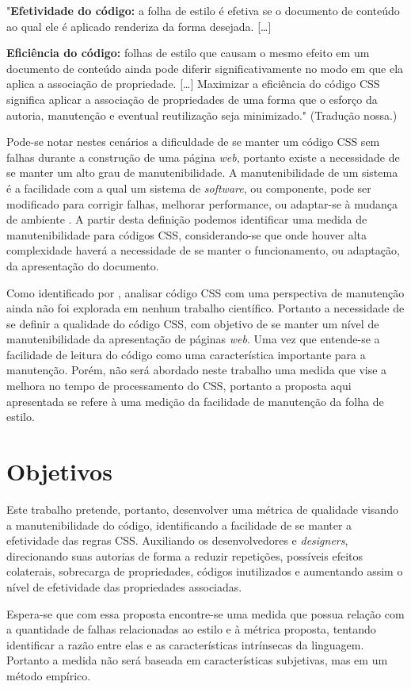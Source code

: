 \begin{citacao}
	"\textbf{Efetividade do código:} a folha de estilo é efetiva se o documento de conteúdo ao qual ele é aplicado renderiza da forma desejada. [\ldots]
	
	\textbf{Eficiência do código:} folhas de estilo que causam o mesmo efeito em um documento de conteúdo ainda pode diferir significativamente no modo em que ela aplica a associação de propriedade. [\ldots] Maximizar a eficiência do código CSS significa aplicar a associação de propriedades de uma forma que o esforço da autoria, manutenção e eventual reutilização seja minimizado." (Tradução nossa.)
\end{citacao}

Pode-se notar nestes cenários a dificuldade de se manter um código CSS sem falhas durante a construção de uma página \textit{web}, portanto existe a necessidade de se manter um alto grau de manutenibilidade. A manutenibilidade de um sistema é a facilidade com a qual um sistema de \textit{software}, ou componente, pode ser modificado para corrigir falhas, melhorar performance, ou adaptar-se à mudança de ambiente  \cite{Ieee1990}. A partir desta definição podemos identificar uma medida de manutenibilidade para códigos CSS, considerando-se que onde houver alta complexidade haverá a necessidade de se manter o funcionamento, ou adaptação, da apresentação do documento.

Como identificado por , analisar código CSS com uma perspectiva de manutenção ainda não foi explorada em nenhum trabalho científico. Portanto a necessidade de se definir a qualidade do código CSS, com objetivo de se manter um nível de manutenibilidade da apresentação de páginas \textit{web}. Uma vez que entende-se a facilidade de leitura do código como uma característica importante para a manutenção. Porém, não será abordado neste trabalho uma medida que vise a melhora no tempo de processamento do CSS, portanto a proposta aqui apresentada se refere à uma medição da facilidade de manutenção da folha de estilo.


\section{Objetivos}
Este trabalho pretende, portanto, desenvolver uma métrica de qualidade visando a manutenibilidade do código, identificando a facilidade de se manter a efetividade das regras CSS. Auxiliando os desenvolvedores e \textit{designers}, direcionando suas autorias de forma a reduzir repetições, possíveis efeitos colaterais, sobrecarga de propriedades, códigos inutilizados e aumentando assim o nível de efetividade das propriedades associadas.

Espera-se que com essa proposta encontre-se uma medida que possua relação com a quantidade de falhas relacionadas ao estilo e à métrica proposta, tentando identificar a razão entre elas e as características intrínsecas da linguagem. Portanto a medida não será baseada em características subjetivas, mas em um método empírico.

